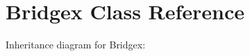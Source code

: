 \hypertarget{class_bridgex}{}\section{Bridgex Class Reference}
\label{class_bridgex}


Inheritance diagram for Bridgex\+:
